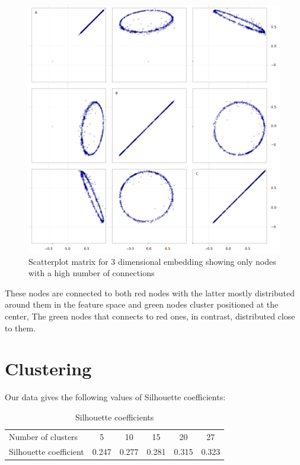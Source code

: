 \begin{figure}[H]   \centering
    \includegraphics[width=0.7\linewidth]{plots/ScatterplotMatrix2.png}
    \caption{Scatterplot matrix for 3 dimensional embedding showing only nodes with a high number of connections}
    \label{fig:my_label}
\end{figure}

These nodes are connected to both red nodes with the latter mostly distributed around them in the feature space and green nodes cluster positioned at the center, The green nodes that connects to red ones, in contrast, distributed close to them.

\section{Clustering}

Our data gives the following values of Silhouette coefficients: 
\begin{table}[H]
    \centering
    \begin{tabular}{|l|ccccc|}
        \hline
        Number of clusters   & 5  & 10  & 15 & 20 & 27 \\
        Silhouette coefficient & 0.247 & 0.277 & 0.281 & 0.315 & 0.323 \\
        \hline
    \end{tabular}
    \caption{Silhouette coefficients}
    \label{tab:my_label}
\end{table}

